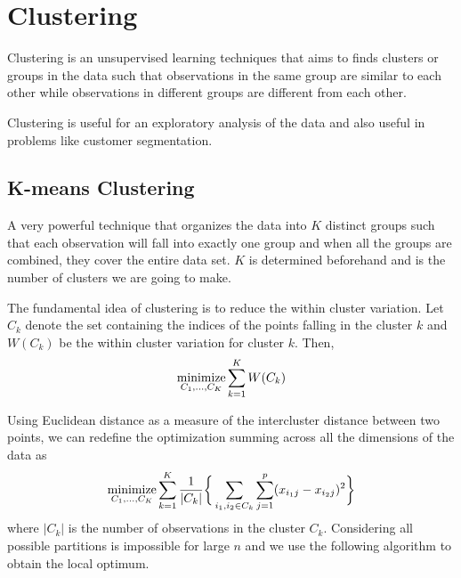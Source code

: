 \documentclass[../statistical_learning_notes.tex]{subfiles}
\begin{document}
    \chapter{Clustering}
    Clustering is an unsupervised learning techniques that aims to finds clusters or groups in the data such that observations in the same group are similar to each other while observations in different groups are different from each other.\newline

    Clustering is useful for an exploratory analysis of the data and also useful in problems like customer segmentation.

    \section{K-means Clustering}
    A very powerful technique that organizes the data into $K$ distinct groups such that each observation will fall into exactly one group and when all the groups are combined, they cover the entire data set. $K$ is determined beforehand and is the number of clusters we are going to make.\newline

    The fundamental idea of clustering is to reduce the within cluster variation. Let $C_{k}$ denote the set containing the indices of the points falling in the cluster $k$ and $W(C_{k})$ be the within cluster variation for cluster $k$. Then,
    \begin{align*}
        \operatorname*{minimize}_{C_{1},\ldots,C_{K}} \sum_{k=1}^{K} W(C_{k})
    \end{align*}

    Using Euclidean distance as a measure of the intercluster distance between two points, we can redefine the optimization summing across all the dimensions of the data as
    \begin{align*}
        \operatorname*{minimize}_{C_{1},\ldots,C_{K}} \sum_{k=1}^{K} \frac{1}{\vert C_{k} \vert} \bigg\{\sum_{i_{1}, i_{2} \in C_{k}} \sum_{j=1}^{p} (x_{i_{1}j} - x_{i_{2}j})^{2} \bigg \}
    \end{align*}
    where $\vert C_{k} \vert$ is the number of observations in the cluster $C_{k}$. Considering all possible partitions is impossible for large $n$ and we use the following algorithm to obtain the local optimum.


\end{document}
